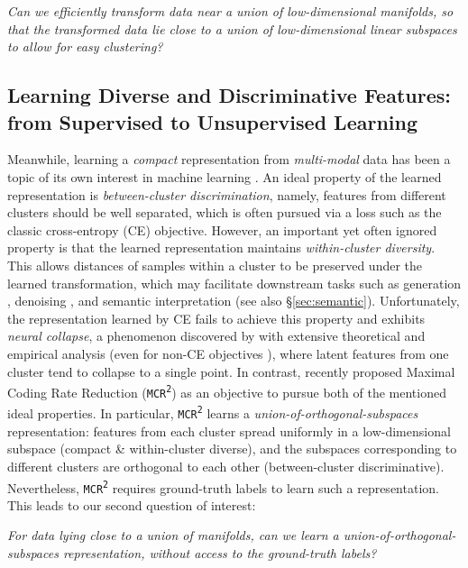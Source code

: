\documentclass[10pt,twocolumn,letterpaper]{article}
\newcommand{\mcr}{\texttt{MCR\textsuperscript{2}}}
\begin{document}
   \begin{question}
       {\em Can we efficiently transform data near a union of low-dimensional manifolds, so that the transformed data lie close to a union of low-dimensional linear subspaces to allow for easy clustering?}
   \end{question}
   
   
   \subsection{Learning Diverse and Discriminative Features: from Supervised to Unsupervised Learning}
   Meanwhile, learning a \textit{compact} representation from \textit{multi-modal} data has been a topic of its own interest in machine learning \cite{Bengio2013-ps}. An ideal property of the learned representation is \textit{between-cluster discrimination}, namely, features from different clusters should be well separated, which is often pursued via a loss such as the classic cross-entropy (CE) objective. However, an important yet often ignored property is that the learned representation maintains \textit{within-cluster diversity}. This allows distances of samples within a cluster to be preserved under the learned transformation, which may facilitate downstream tasks such as generation \cite{Dai2022-ui}, denoising \cite{Wang2013-nw}, and semantic interpretation \cite[\S B.3.1]{Yu2020-mx} (see also \S \ref{sec:semantic}). 
    Unfortunately, the representation learned by CE fails to achieve this property and exhibits \textit{neural collapse}, a phenomenon discovered by \cite{Papyan2020-go} with extensive theoretical and empirical analysis \cite{Mixon2020-oe,Zhu2021-ki,Tirer2022-sy,Zhou2022-yq} (even for non-CE objectives \cite{Zhou2022-ob}), where latent features from one cluster tend to collapse to a single point. In contrast, \cite{Yu2020-mx} recently proposed Maximal Coding Rate Reduction (\mcr) as an objective to pursue both of the mentioned ideal properties. In particular, \mcr{} learns a \textit{union-of-orthogonal-subspaces} representation: features from each cluster spread uniformly in a low-dimensional subspace (compact \& within-cluster diverse), and the subspaces corresponding to different clusters are orthogonal to each other (between-cluster discriminative). Nevertheless, \mcr{} requires ground-truth labels to learn such a representation. %
This leads to our second question of interest:
   \begin{question}
       {\em For data lying close to a union of manifolds, can we learn a union-of-orthogonal-subspaces representation, without access to the ground-truth labels?}
   \end{question}
\end{document}
